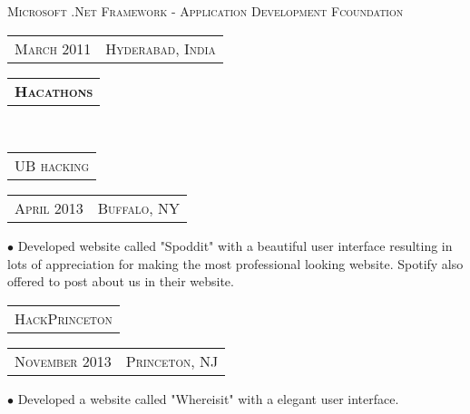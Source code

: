 \documentclass[10pt,a4paper,oneside]{article}
\begin{document}
    \vspace{-12pt}
    \begin{adjustwidth}{7pt}{0pt}
        {\small M\textsc{icrosoft} .N\textsc{et} F\textsc{ramework} - A\textsc{pplication} D\textsc{evelopment} F\textsc{coundation}}
        \hspace{1.54in}
    \textcolor{light-gray}{
        \begin{tabular}{c|c}
            {\small M\textsc{arch 2011}}
            &{\small H\textsc{yderabad}, I\textsc{ndia}}
        \end{tabular}
    }
    \vspace{-10pt}
    \end{adjustwidth}
    \begin{tabular}{c}
        \textbf{\normalsize H\textsc{acathons}}
    \end{tabular}\\
    \begin{tabular}{c}
        {\small UB\textsc{ hacking}}
    \end{tabular}
    \hspace{5.35in}
    \textcolor{light-gray}{
        \begin{tabular}{c|c}
            {\small A\textsc{pril 2013}}
            &{\small B\textsc{uffalo}, NY}
        \end{tabular}
    }
    \vspace{-12pt}
    \begin{adjustwidth}{7pt}{0pt}
        {\footnotesize  $\bullet$ Developed website called "Spoddit" with a beautiful user interface resulting in lots of appreciation for making the most professional looking website. Spotify also  offered to post about us in their website.}\\
    \end{adjustwidth}
    \vspace{-12pt}
    \begin{tabular}{c}
        {\small H\textsc{ack}P\textsc{rinceton}}
    \end{tabular}
    \hspace{4.7in}
    \textcolor{light-gray}{
        \begin{tabular}{c|c}
            {\small N\textsc{ovember 2013}}
            &{\small P\textsc{rinceton}, NJ}
        \end{tabular}
    }
    \vspace{-12pt}
    \begin{adjustwidth}{7pt}{0pt}
            {\footnotesize $\bullet$ Developed a website called "Whereisit" with a elegant user interface.}\\
    \end{adjustwidth}
\end{document}
